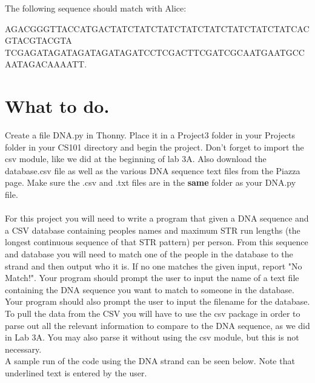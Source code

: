 \documentclass[11pt, letterpaper, onecolumn, oneside, final]{article}
\begin{document}
The following sequence should match with Alice:
\begin{center}
{\consolas AGACGGGTTACCATGACTATCTATCTATCTATCTATCTATCTATCTATCACGTACGTACGTA\\TCGAGATAGATAGATAGATAGATCCTCGACTTCGATCGCAATGAATGCCAATAGACAAAATT}.
\end{center}
\newpage
    \section{What to do.}
    
    Create a file {\consolas DNA.py} in Thonny. Place it in a Project3 folder in your Projects folder in your CS101 directory and begin the project. Don't forget to import the {\consolas csv} module, like we did at the beginning of lab 3A. Also download the {\consolas database.csv} file as well as the various DNA sequence text files from the Piazza page. Make sure the .csv and .txt  files are in the \textbf{same} folder as your {\consolas DNA.py} file. \\
    \\
    For this project you will need to write a program that given a DNA sequence and a CSV database containing peoples names and maximum STR run lengths (the longest continuous sequence of that STR pattern) per person. From this sequence and database you will need to match one of the people in the database to the strand and then output who it is. If no one matches the given input, report "No Match!".
    Your program should prompt the user to input the name of a text file containing the DNA sequence you want to match to someone in the database. Your program should also prompt the user to input the filename for the database. To pull the data from the CSV you will have to use the {\consolas csv} package in order to parse out all the relevant information to compare to the DNA sequence, as we did in Lab 3A. You may also parse it without using the {\consolas csv} module, but this is not necessary. 
    \\
    
    A sample run of the code using the DNA strand can be seen below. Note that underlined text is entered by the user. \\

  \\
   \\
 \hspace*{10mm}{\consolas Alice} \\
\end{document}
